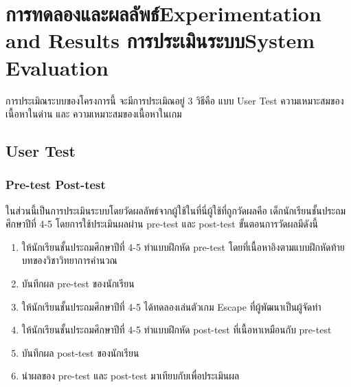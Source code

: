 \chapter{\ifproject%
\ifcpe การทดลองและผลลัพธ์\else Experimentation and Results\fi
\else%
\ifcpe การประเมินระบบ\else System Evaluation\fi
\fi}

การประเมิณระบบของโครงการนี้ จะมีการประเมิณอยู่ 3 วิธีคือ แบบ User Test ความเหมาะสมของเนื้อหาในด่าน
และ ความเหมาะสมของเนื้อหาในเกม

\section{User Test}
\subsection{Pre-test Post-test}
ในส่วนนี้เป็นการประเมินระบบโดยวัดผลลัพธ์จากผู้ใช้ในที่นี่ผู้ใช้ที่ถูกวัดผลคือ เด็กนักเรียนชั้นประถมศึกษาปีที่ 4-5
โดยการใช้ประเมินผลผ่าน pre-test และ post-test ขั้นตอนการวัดผลมีดังนี้
\begin{enumerate}
    \item ให้นักเรียนชั้นประถมศึกษาปีที่ 4-5 ทำแบบฝึกหัด pre-test โดยที่เนื้อหาอิงตามแบบฝึกหัดท้ายบทของวิชาวิทยาการคำนวณ
    \item บันทึกผล pre-test ของนักเรียน
    \item ให้นักเรียนชั้นประถมศึกษาปีที่ 4-5 ได้ทดลองเล่นตัวเกม Escape ที่ผู้พัฒนาเป็นผู้จัดทำ
    \item ให้นักเรียนชั้นประถมศึกษาปีที่ 4-5 ทำแบบฝึกหัด post-test ที่เนื้อหาเหมือนกับ pre-test
    \item บันทึกผล post-test ของนักเรียน
    \item นำผลของ pre-test และ post-test มาเทียบกับเพื่อประเมินผล
\end{enumerate}
